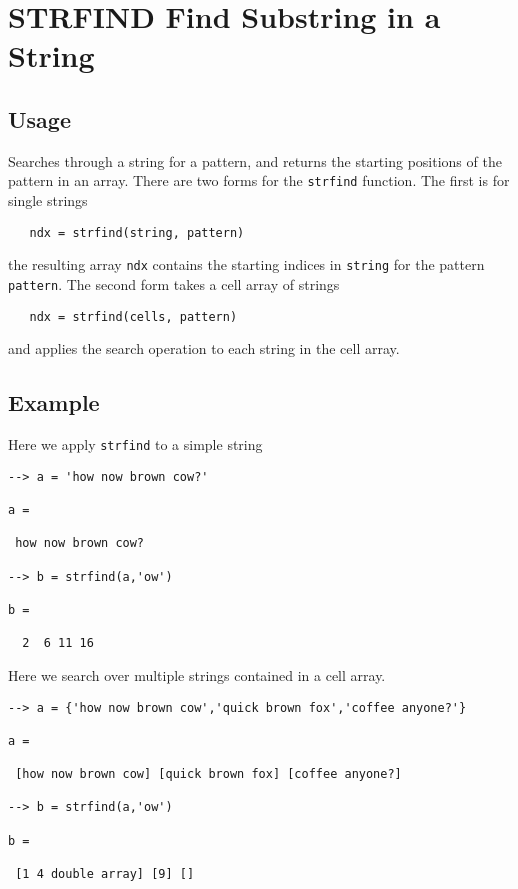 \section{STRFIND Find Substring in a String}

\subsection{Usage}

Searches through a string for a pattern, and returns the starting
positions of the pattern in an array.  There are two forms for 
the \verb|strfind| function.  The first is for single strings
\begin{verbatim}
   ndx = strfind(string, pattern)
\end{verbatim}
the resulting array \verb|ndx| contains the starting indices in \verb|string|
for the pattern \verb|pattern|.  The second form takes a cell array of 
strings
\begin{verbatim}
   ndx = strfind(cells, pattern)
\end{verbatim}
and applies the search operation to each string in the cell array.
\subsection{Example}

Here we apply \verb|strfind| to a simple string
\begin{verbatim}
--> a = 'how now brown cow?'

a = 

 how now brown cow?

--> b = strfind(a,'ow')

b = 

  2  6 11 16 
\end{verbatim}
Here we search over multiple strings contained in a cell array.
\begin{verbatim}
--> a = {'how now brown cow','quick brown fox','coffee anyone?'}

a = 

 [how now brown cow] [quick brown fox] [coffee anyone?] 

--> b = strfind(a,'ow')

b = 

 [1 4 double array] [9] [] 
\end{verbatim}
